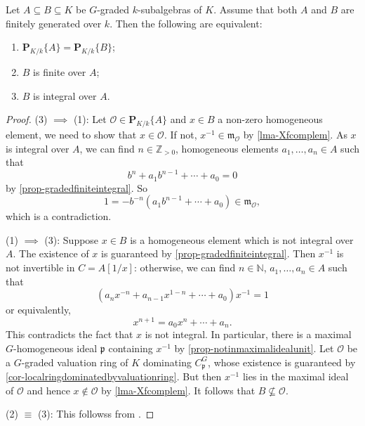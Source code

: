 \begin{lemma}\label{lma-gradedRZaffeq}
    Let $A\subseteq B\subseteq K$ be $G$-graded $k$-subalgebras of $K$. Assume that both $A$ and $B$ are finitely generated over $k$. Then the following are equivalent:
    \begin{enumerate}
        \item $\mathbf{P}_{K/k}\{A\}=\mathbf{P}_{K/k}\{B\}$;
        \item $B$ is finite over $A$;
        \item $B$ is integral over $A$.
    \end{enumerate}
\end{lemma}
\begin{proof}
    (3) $\implies$ (1): Let $\mathcal{O}\in \mathbf{P}_{K/k}\{A\}$ and $x\in B$ a non-zero homogeneous element, we need to show that $x\in \mathcal{O}$. If not, $x^{-1}\in \mathfrak{m}_{\mathcal{O}}$ by \cref{lma-Xfcomplem}. As $x$ is integral over $A$, we can find $n\in \mathbb{Z}_{>0}$, homogeneous elements $a_1,\ldots,a_{n}\in A$ such that
    \[
        b^n+a_1 b^{n-1}+\cdots+a_0=0  
    \]
    by \cref{prop-gradedfiniteintegral}. So 
    \[
        1=-b^{-n}\left(a_1 b^{n-1}+\cdots+a_0\right)\in \mathfrak{m}_{\mathcal{O}},  
    \]
    which is a contradiction.

    (1) $\implies$ (3): Suppose $x\in B$ is a homogeneous element which is not integral over $A$. The existence of $x$ is guaranteed by \cref{prop-gradedfiniteintegral}. Then $x^{-1}$ is not invertible in $C=A[1/x]$: otherwise, we can find $n\in \mathbb{N}$, $a_1,\ldots,a_n\in A$ such that
    \[
        (a_nx^{-n}+a_{n-1}x^{1-n}+\cdots+a_0)x^{-1}=1  
    \]
    or equivalently,
    \[
        x^{n+1}=a_0x^n+\cdots+ a_n.  
    \]
    This contradicts the fact that $x$ is not integral. In particular, there is a maximal $G$-homogeneous ideal $\mathfrak{p}$ containing $x^{-1}$ by \cref{prop-notinmaximalidealunit}. Let $\mathcal{O}$ be a $G$-graded valuation ring of $K$ dominating $C_{\mathfrak{p}}^G$, whose existence is guaranteed by \cref{cor-localringdominatedbyvaluationring}.
    But then $x^{-1}$ lies in the maximal ideal of $\mathcal{O}$ and hence $x\not\in \mathcal{O}$ by \cref{lma-Xfcomplem}. It follows that $B\not\subseteq \mathcal{O}$.

    (2) $\equiv$ (3): This followss from \cite[\href{https://stacks.math.columbia.edu/tag/02JJ}{Tag 02JJ}]{stacks-project}.

\end{proof}

